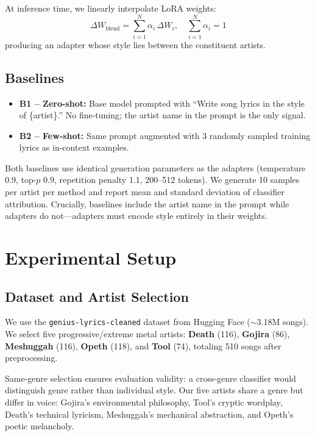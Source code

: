 \documentclass[runningheads]{llncs}
\begin{document}
At inference time, we linearly interpolate LoRA weights:
\begin{equation}
    \Delta W_{\text{blend}} = \sum_{i=1}^{N} \alpha_i \, \Delta W_i, \quad \sum_{i=1}^{N} \alpha_i = 1
\end{equation}
producing an adapter whose style lies between the constituent artists.

\subsection{Baselines}

\begin{itemize}
    \item \textbf{B1 -- Zero-shot:} Base model prompted with ``Write song lyrics in the style of \{artist\}.'' No fine-tuning; the artist name in the prompt is the only signal.
    \item \textbf{B2 -- Few-shot:} Same prompt augmented with 3 randomly sampled training lyrics as in-context examples.
\end{itemize}

Both baselines use identical generation parameters as the adapters (temperature 0.9, top-$p$ 0.9, repetition penalty 1.1, 200--512 tokens). We generate 10 samples per artist per method and report mean and standard deviation of classifier attribution. Crucially, baselines include the artist name in the prompt while adapters do not---adapters must encode style entirely in their weights.

\section{Experimental Setup}
\label{sec:setup}

\subsection{Dataset and Artist Selection}

We use the \texttt{genius-lyrics-cleaned} dataset from Hugging Face (${\sim}$3.18M songs). We select five progressive/extreme metal artists: \textbf{Death} (116), \textbf{Gojira} (86), \textbf{Meshuggah} (116), \textbf{Opeth} (118), and \textbf{Tool} (74), totaling 510 songs after preprocessing.

Same-genre selection ensures evaluation validity: a cross-genre classifier would distinguish genre rather than individual style. Our five artists share a genre but differ in voice: Gojira's environmental philosophy, Tool's cryptic wordplay, Death's technical lyricism, Meshuggah's mechanical abstraction, and Opeth's poetic melancholy.
\end{document}
